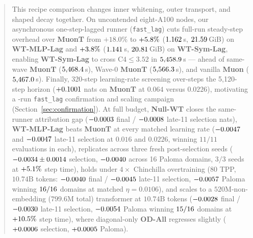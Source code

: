 \documentclass[11pt]{article}
\newcommand*{\pagesfsb}{\sffamily\bfseries}
\newcommand{\taxid}[1]{{\pagesfsb #1}}
\begin{document}
\begin{abstract}
This recipe comparison changes inner whitening, outer transport, and shaped
decay together.
On uncontended eight-A100 nodes, our asynchronous one-step-lagged runner
(\texttt{fast\_lag}) cuts full-run steady-step overhead over \taxid{MuonT} from
$+18.0\%$ to $+\sysExecMlpLagVsMuontPct\%$ ($\sysExecMlpLagStepS$\,s,
$\sysExecMlpLagGib$\,GiB) on \taxid{WT-MLP-Lag} and $+\sysExecSymLagVsMuontPct\%$
($\sysExecSymLagStepS$\,s, $\sysExecSymLagGib$\,GiB) on \taxid{WT-Sym-Lag},
enabling \taxid{WT-Sym-Lag} to cross $\text{C4}\le 3.52$ in
$\sysCrossSymLagThreeFiveTwoS$\,s --- ahead of same-wave \taxid{MuonT}
($\sysCrossMuontSymThreeFiveTwoS$\,s), Wave-0 \taxid{MuonT}
($\sysCrossMuontWaveZeroThreeFiveTwoS$\,s), and vanilla \taxid{Muon}
($\sysCrossMuonWaveZeroThreeFiveTwoS$\,s). Finally, 320-step learning-rate
screening over-steps the 5{,}120-step horizon ($\waveTwelveMuontSelDiff{}$ nats on
\taxid{MuonT} at $0.064$ versus $0.0226$), motivating a \confTotalRuns{}-run
\texttt{fast\_lag} confirmation and scaling campaign
(Section~\ref{sec:confirmation}). At full budget, \taxid{Null-WT} closes the
same-runner attribution gap ($\confNullFinalSelDelta{}$ final /
$\confNullLateSelDelta{}$ late-11 selection nats), \taxid{WT-MLP-Lag} beats
\taxid{MuonT} at every matched learning rate ($\confPOneZeroOneSixWtLateSel{}$
and $\confPOneZeroTwoTwoWtLateSel{}$ late-11 selection at $0.016$ and $0.0226$,
winning $11/11$ evaluations in each), replicates across three fresh
post-selection seeds ($\confPTwoWtSelDeltaMean{} \pm \confPTwoWtSelDeltaStd{}$
selection, $\confPTwoWtPalomaDeltaMean{}$ across 16 Paloma domains, $3/3$ seeds
at $+\confPTwoWtStepPct\%$ step time), holds under $4\times$ Chinchilla
overtraining ($80$ TPP, $10.74\text{B}$ tokens: $\confPThreeWtFinalSel{}$ final /
$\confPThreeWtLateSel{}$ late-11 selection, $\confPThreeWtPalomaDelta{}$ Paloma
winning $\confPThreeWtPalomaWins{}/16$ domains at matched $\eta = 0.0106$), and
scales to a $520\text{M}$-non-embedding ($799.6\text{M}$ total) transformer at
$10.74\text{B}$ tokens ($\confPFourWtFinalSel{}$ final / $\confPFourWtLateSel{}$
late-11 selection, $\confPFourWtPalomaDelta{}$ Paloma winning
$\confPFourWtPalomaWins{}/16$ domains at $+\confPFourWtStepPct\%$ step time),
where diagonal-only \taxid{OD-All} regresses slightly
($\confPFourOdFinalSel{}$ selection, $\confPFourOdPalomaDelta{}$ Paloma).
\end{abstract}












\FloatBarrier


\FloatBarrier



\appendix



\end{document}

